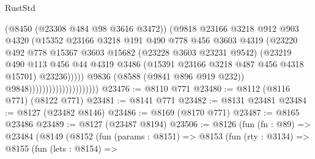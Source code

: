 \begin{lexlean}{RustStd}
\begin{coremodule}
                                                (@8450 (@23308 @484 @98 @3616 @3472))
                                                (@9818
                                                  @23166
                                                  @3218
                                                  @912
                                                  @903
                                                  @4320
                                                  (@15352
                                                    @23166
                                                    @3218
                                                    @191
                                                    @490
                                                    @778
                                                    @456
                                                    @3603
                                                    @4319
                                                    (@23220
                                                      @492
                                                      @778
                                                      @15367
                                                      @3603
                                                      @15682
                                                      (@23228 @3603 @23231 @9542)
                                                      (@23219
                                                        @490
                                                        @113
                                                        @456
                                                        @44
                                                        @4319
                                                        @3486
                                                        (@15391 @23166 @3218 @487 @456 @4318 @15701)
                                                        @23236)))))
                                              @9836
                                              (@8588 (@9841 @896 @919 @232))
                                              @9848)))))))))))))))))))))
@23476 := @8110 @771
@23480 := @8112 (@8116 @771) (@8122 @771)
@23481 := @8141 @771
@23482 := @8131 @23481
@23484 := @8127 (@23482 @8146)
@23486 := @8169 (@8170 @771)
@23487 := @8165 @23486
@23489 := @8127 (@23487 @8194)
@23506 := @8126
    (fun (fn : @89) =>
    @23484
      (@8149
        (@8152
          (fun (params : @8151) =>
          @8153
            (fun (rty : @3134) =>
            @8155
              (fun (lets : @8154) =>

\end{coremodule}
\end{lexlean}
